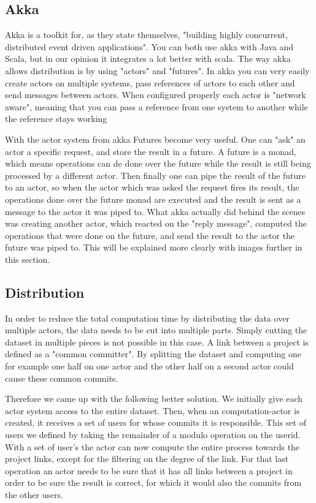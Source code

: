 \documentclass[10pt,a4paper]{article}
\begin{document}
\subsection{Akka}

Akka is a toolkit for, as they state themselves, "building highly concurrent, distributed event driven applications". You can both use akka with Java and Scala, but in our opinion it integrates a lot better with scala. The way akka allows distribution is by using "actors" and "futures". In akka you can very easily create actors on multiple systems, pass references of actors to each other and send messages between actors. When configured properly each actor is "network aware", meaning that you can pass a reference from one system to another while the reference stays working

With the actor system from akka Futures become very useful. One can "ask" an actor a specific request, and store the result in a future. A future is a monad, which means operations can de done over the future while the result is still being processed by a different actor.  Then finally one can pipe the result of the future to an actor, so when the actor which was asked the request fires its result, the operations done over the future monad are executed and the result is sent as a message to the actor it was piped to. What akka actually did behind the scenes was creating another actor, which reacted on the "reply message", computed the operations that were done on the future, and send the result to the actor the future was piped to. This will be explained more clearly with images further in this section.

\subsection{Distribution}

In order to reduce the total computation time by distributing the data over multiple actors, the data needs to be cut into multiple parts. Simply cutting the dataset in multiple pieces is not possible in this case. A link between a project is defined as a "common committer". By splitting the dataset and computing one for example one half on one actor and the other half on a second actor could cause these common commits. 

Therefore we came up with the following better solution. We initially give each actor system access to the entire dataset. Then, when an computation-actor is created, it receives a set of users for whose commits it is responsible. This set of users we defined by taking the remainder of a modulo operation on the userid. With a set of user's the actor can now compute the entire process towards the project links, except for the filtering on the degree of the link. For that last operation an actor needs to be sure that it has all links between a project in order to be sure the result is correct, for which it would also the commits from the other users.
\end{document}
